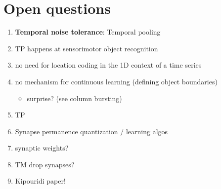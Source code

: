 \documentclass[a4paper,10pt]{article}
\begin{document}
\section{Open questions}
\begin{enumerate}
  \item \textbf{Temporal noise tolerance}: Temporal pooling
  \item TP happens at sensorimotor object recognition
  \item no need for location coding in the 1D context of a time series
  \item no mechanism for continuous learning (defining object boundaries)
      \begin{itemize}
        \item surprise? (see column bursting)
      \end{itemize}
  \item TP
  \item Synapse permanence quantization / learning algos
  \item synaptic weights?
  \item TM drop synapses?
  \item Kipouridi paper!
\end{enumerate}
\end{document}
